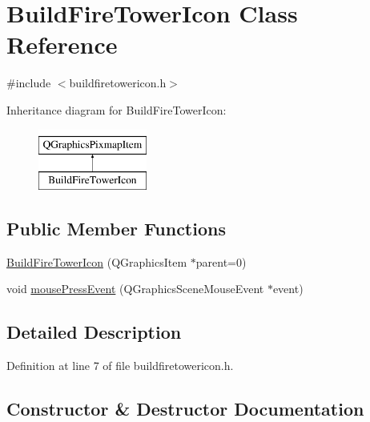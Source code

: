 \hypertarget{class_build_fire_tower_icon}{}\section{Build\+Fire\+Tower\+Icon Class Reference}
\label{class_build_fire_tower_icon}


{\ttfamily \#include $<$buildfiretowericon.\+h$>$}

Inheritance diagram for Build\+Fire\+Tower\+Icon\+:\begin{figure}[H]
\begin{center}
\leavevmode
\includegraphics[height=2.000000cm]{class_build_fire_tower_icon}
\end{center}
\end{figure}
\subsection*{Public Member Functions}
\begin{DoxyCompactItemize}
\item 
\hyperlink{class_build_fire_tower_icon_a22891d990d32a248905f91348fe10f09}{Build\+Fire\+Tower\+Icon} (Q\+Graphics\+Item $\ast$parent=0)
\item 
void \hyperlink{class_build_fire_tower_icon_a878a78832a73bac6245ec0ae5bce5c60}{mouse\+Press\+Event} (Q\+Graphics\+Scene\+Mouse\+Event $\ast$event)
\end{DoxyCompactItemize}


\subsection{Detailed Description}


Definition at line 7 of file buildfiretowericon.\+h.



\subsection{Constructor \& Destructor Documentation}
\mbox{\label{class_build_fire_tower_icon_a22891d990d32a248905f91348fe10f09}} 
